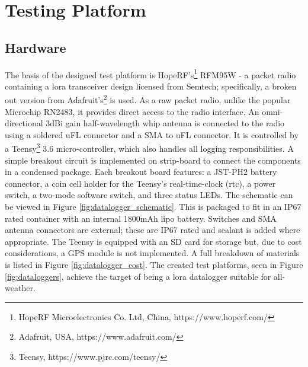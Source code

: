 \section{Testing  Platform}\label{sec:testing_platform}
\subsection{Hardware}
The basis of the designed test platform is HopeRF's\footnote{HopeRF Microelectronics Co. Ltd, China, https://www.hoperf.com/} RFM95W - a packet radio containing a \ac{lora} transceiver design licensed from Semtech; specifically, a broken out version from  Adafruit's\footnote{Adafruit, USA, https://www.adafruit.com/} is used. As a raw packet radio, unlike the popular Microchip RN2483, it provides direct access to the radio interface. An omni-directional 3dBi gain half-wavelength whip antenna is connected to the radio using a soldered uFL connector and a SMA to uFL connector. It is controlled by a Teensy\footnote{Teensy, https://www.pjrc.com/teensy/} 3.6 micro-controller, which also handles all logging responsibilities. A simple breakout circuit is implemented on strip-board to connect the components in a condensed package. Each breakout board features: a JST-PH2 battery connector, a coin cell holder for the Teensy's real-time-clock (\ac{rtc}), a power switch, a two-mode software switch, and three status LEDs. The schematic can be viewed in Figure \ref{fig:datalogger_schematic}. This is packaged to fit in an IP67 rated container with an internal 1800mAh \ac{lipo} battery. Switches and SMA antenna connectors are external; these are IP67 rated and sealant is added where appropriate. The Teensy is equipped with an SD card for storage but, due to cost considerations, a GPS module is not implemented. A full breakdown of materials is listed in Figure \ref{fig:datalogger_cost}. The created test platforms, seen in Figure \ref{fig:dataloggers}, achieve the target of being a \ac{lora} datalogger suitable for all-weather.


